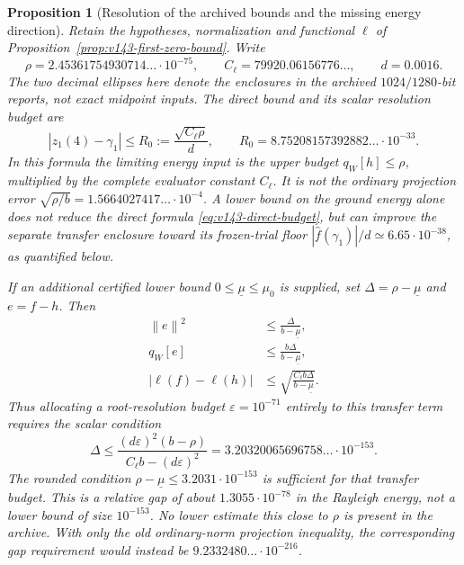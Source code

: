 \documentclass[11pt]{article}
\newtheorem{proposition}[theorem]{Proposition}
\theoremstyle{remark}
\newcommand{\norm}[1]{\left\lVert #1\right\rVert}
\begin{document}
\begin{proposition}[Resolution of the archived bounds and the missing energy direction]
\label{prop:v143-resolution}
Retain the hypotheses, normalization and functional $\ell$ of
Proposition~\ref{prop:v143-first-zero-bound}. Write
\[
 \rho=2.45361754930714\ldots\cdot10^{-75},\qquad
 C_\ell=79920.06156776\ldots,\qquad d=0.0016.
\]
The two decimal ellipses here denote the enclosures in the archived
$1024/1280$-bit reports, not exact midpoint inputs.
The direct bound and its scalar resolution budget are
\begin{equation}\label{eq:v143-direct-budget}
 |z_1(4)-\gamma_1|\le R_0:=\frac{\sqrt{C_\ell\rho}}d,
 \qquad R_0=8.75208157392882\ldots\cdot10^{-33}.
\end{equation}
In this formula the limiting energy input is the \emph{upper} budget
$q_W[h]\le\rho$, multiplied by the complete evaluator constant
$C_\ell$. It is not the ordinary projection error
$\sqrt{\rho/b}=1.5664027417\ldots\cdot10^{-4}$.
A lower bound on the ground energy alone does not reduce the direct
formula \eqref{eq:v143-direct-budget}, but can improve the separate
transfer enclosure toward its frozen-trial floor
$|\widehat f(\gamma_1)|/d\simeq6.65\cdot10^{-38}$, as quantified below.

If an additional certified lower bound $0\le\underline\mu\le\mu_0$
is supplied, set $\Delta=\rho-\underline\mu$ and $e=f-h$. Then
\begin{align}
 \norm e^2&\le\frac{\Delta}{b-\underline\mu},\label{eq:v143-lower-norm}\\
 q_W[e]&\le\frac{b\Delta}{b-\underline\mu},\label{eq:v143-lower-energy}\\
 |\ell(f)-\ell(h)|&\le
 \sqrt{\frac{C_\ell b\Delta}{b-\underline\mu}}.
 \label{eq:v143-lower-transfer}
\end{align}
Thus allocating a root-resolution budget $\varepsilon=10^{-71}$
entirely to this transfer term requires the scalar condition
\begin{equation}\label{eq:v143-required-lower}
 \Delta\le
 \frac{(d\varepsilon)^2(b-\rho)}{C_\ell b-(d\varepsilon)^2}
 =3.20320065696758\ldots\cdot10^{-153}.
\end{equation}
The rounded condition $\rho-\underline\mu\le3.2031\cdot10^{-153}$
is sufficient for that transfer budget. This is a relative gap of
about $1.3055\cdot10^{-78}$ in the Rayleigh energy, not a lower
bound of size $10^{-153}$. No lower estimate this close to $\rho$
is present in the archive. With only the old ordinary-norm projection
inequality, the corresponding gap requirement would instead be
$9.2332480\ldots\cdot10^{-216}$.


\end{proposition}
\end{document}
